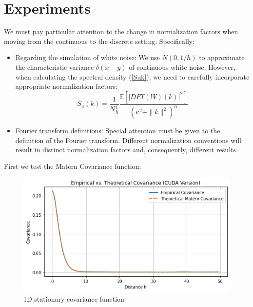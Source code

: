 \documentclass{article}
\begin{document}
\section{Experiments}
We must pay particular attention to the change in normalization factors when moving from the continuous to the discrete setting. Specifically:
\begin{itemize}
	\item Regarding the simulation of white noise:
	We use $N(0,1/h)$ to approximate the characteristic variance $\delta(x-y)$ of continuous white noise. 
	However, when calculating the spectral density (\ref{Suk}), we need to carefully incorporate appropriate normalization factors:
	\begin{equation}
		S_u(k) = \frac{1}{N\frac{1}{h}}\frac{\mathbb{E}\left[\left|DFT(W)(k)\right|^2\right]}{(\kappa^2 + \|k\|^2)^{\alpha}} 
	\end{equation}
	\item Fourier transform definitions:
	Special attention must be given to the definition of the Fourier transform. Different normalization conventions will result in distinct normalization factors and, consequently, different results.
\end{itemize}
First we test the Matern Covariance function:
\begin{figure}[h]
    \centering
    \includegraphics[width=0.5\linewidth]{pics/1D_Empirical_vs_Theoretical_Covariance_2048_100.0_2_1.png}
    \caption{1D stationary covariance function}
    \label{1d_matern_covariance}
\end{figure}
\end{document}
